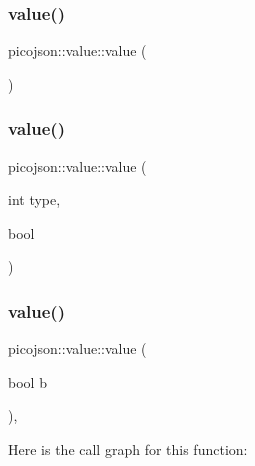 \subsubsection{\texorpdfstring{value()}{value()}\hspace{0.1cm}{\footnotesize\ttfamily [1/10]}}
{\footnotesize\ttfamily picojson\+::value\+::value (\begin{DoxyParamCaption}{ }\end{DoxyParamCaption})\hspace{0.3cm}{\ttfamily [inline]}}

\hypertarget{classpicojson_1_1value_acd1d55ac7333a3e482e469b3d99fdf6e}{}\label{classpicojson_1_1value_acd1d55ac7333a3e482e469b3d99fdf6e} 
\subsubsection{\texorpdfstring{value()}{value()}\hspace{0.1cm}{\footnotesize\ttfamily [2/10]}}
{\footnotesize\ttfamily picojson\+::value\+::value (\begin{DoxyParamCaption}\item[{int}]{type,  }\item[{bool}]{ }\end{DoxyParamCaption})\hspace{0.3cm}{\ttfamily [inline]}}

\hypertarget{classpicojson_1_1value_a43d8a33c3dbea0c5853bef4577a0d10e}{}\label{classpicojson_1_1value_a43d8a33c3dbea0c5853bef4577a0d10e} 
\subsubsection{\texorpdfstring{value()}{value()}\hspace{0.1cm}{\footnotesize\ttfamily [3/10]}}
{\footnotesize\ttfamily picojson\+::value\+::value (\begin{DoxyParamCaption}\item[{bool}]{b }\end{DoxyParamCaption})\hspace{0.3cm}{\ttfamily [inline]}, {\ttfamily [explicit]}}

Here is the call graph for this function\+:
\hypertarget{classpicojson_1_1value_af19f6d5889d90e77e76af05aacaba321}{}\label{classpicojson_1_1value_af19f6d5889d90e77e76af05aacaba321} 
